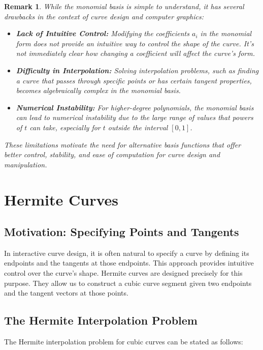 \documentclass{article}
\newtheorem{remark}{Remark}
\begin{document}
\begin{remark}
While the monomial basis is simple to understand, it has several drawbacks in the context of curve design and computer graphics:
\begin{itemize}
    \item \textbf{Lack of Intuitive Control:}  Modifying the coefficients \(a_i\) in the monomial form does not provide an intuitive way to control the shape of the curve.  It's not immediately clear how changing a coefficient will affect the curve's form.
    \item \textbf{Difficulty in Interpolation:} Solving interpolation problems, such as finding a curve that passes through specific points or has certain tangent properties, becomes algebraically complex in the monomial basis.
    \item \textbf{Numerical Instability:} For higher-degree polynomials, the monomial basis can lead to numerical instability due to the large range of values that powers of \(t\) can take, especially for \(t\) outside the interval \([0, 1]\).
\end{itemize}

These limitations motivate the need for alternative basis functions that offer better control, stability, and ease of computation for curve design and manipulation.
\end{remark}

\section{Hermite Curves}

\subsection{Motivation: Specifying Points and Tangents}

In interactive curve design, it is often natural to specify a curve by defining its endpoints and the tangents at those endpoints. This approach provides intuitive control over the curve's shape. Hermite curves are designed precisely for this purpose. They allow us to construct a cubic curve segment given two endpoints and the tangent vectors at those points.

\subsection{The Hermite Interpolation Problem}

The Hermite interpolation problem for cubic curves can be stated as follows:
\end{document}
